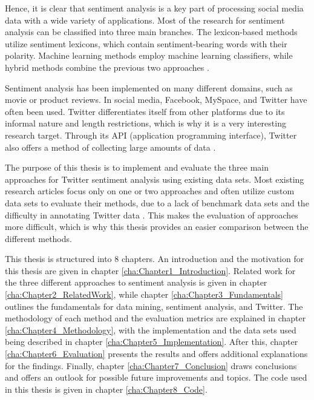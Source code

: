 Hence, it is clear that sentiment analysis is a key part of processing social media data with a wide variety of applications. Most of the research for sentiment analysis can be classified into three main branches. The lexicon-based methods utilize sentiment lexicons, which contain sentiment-bearing words with their polarity. Machine learning methods employ machine learning classifiers, while hybrid methods combine the previous two approaches \cite{MEDHAT20141093}.

Sentiment analysis has been implemented on many different domains, such as movie or product reviews. In social media, Facebook, MySpace, and Twitter have often been used. Twitter differentiates itself from other platforms due to its informal nature and length restrictions, which is why it is a very interesting research target. Through its API (application programming interface), Twitter also offers a method of collecting large amounts of data \cite{DBLP:journals/csur/GiachanouC16}.

The purpose of this thesis is to implement and evaluate the three main approaches for Twitter sentiment analysis using existing data sets. Most existing research articles focus only on one or two approaches and often utilize custom data sets to evaluate their methods, due to a lack of benchmark data sets and the difficulty in annotating Twitter data \cite{DBLP:journals/csur/GiachanouC16}. This makes the evaluation of approaches more difficult, which is why this thesis provides an easier comparison between the different methods.

This thesis is structured into 8 chapters. An introduction and the motivation for this thesis are given in chapter \ref{cha:Chapter1_Introduction}. Related work for the three different approaches to sentiment analysis is given in chapter \ref{cha:Chapter2_RelatedWork}, while chapter \ref{cha:Chapter3_Fundamentals} outlines the fundamentals for data mining, sentiment analysis, and Twitter. The methodology of each method and the evaluation metrics are explained in chapter \ref{cha:Chapter4_Methodology}, with the implementation and the data sets used being described in chapter \ref{cha:Chapter5_Implementation}. After this, chapter \ref{cha:Chapter6_Evaluation} presents the results and offers additional explanations for the findings. Finally, chapter \ref{cha:Chapter7_Conclusion} draws conclusions and offers an outlook for possible future improvements and topics. The code used in this thesis is given in chapter \ref{cha:Chapter8_Code}.




